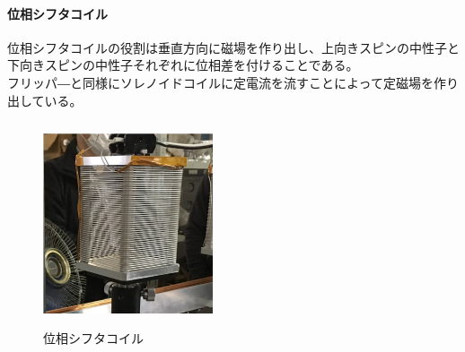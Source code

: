 \paragraph{位相シフタコイル}
位相シフタコイルの役割は垂直方向に磁場を作り出し、上向きスピンの中性子と下向きスピンの中性子それぞれに位相差を付けることである。\\
フリッパ―と同様にソレノイドコイルに定電流を流すことによって定磁場を作り出している。
\begin{figure}[H]
\centering
\includegraphics[width=5cm,height=6cm]{device/shifterphoto.pdf}\caption{位相シフタコイル}
\end{figure}
\endgroup